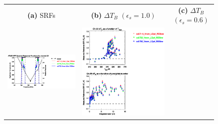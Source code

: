 \begin{figure}[H]
  \centering
  \begin{tabular}{c c c}
    \textsf{\textbf{(a)} SRFs} &
    \textsf{\textbf{(b)} $\Delta T_B$ $(\epsilon_s = 1.0)$} &
    \textsf{\textbf{(c)} $\Delta T_B$ $(\epsilon_s = 0.6)$} \\
    \includegraphics[bb=80 400 280 558,clip,scale=0.85]{graphics/srf/Tset/atms_npp.ch22.osrf.eps} &
    \includegraphics[bb=85 400 260 558,clip,scale=0.85]{graphics/dtb/Tset/e1.0_r0.0/atms_npp.ch22.dTb.eps} & 

\end{tabular}
\end{figure}
